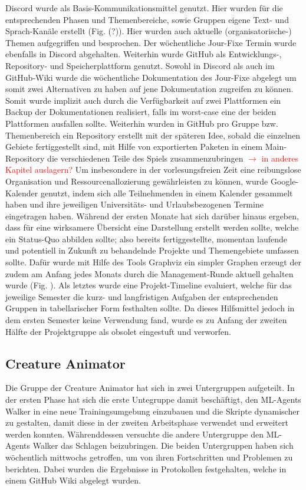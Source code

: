 Discord wurde als Basis-Kommunikationsmittel genutzt. Hier wurden für die entsprechenden Phasen und Themenbereiche, sowie Gruppen eigene Text- und Sprach-Kanäle erstellt (Fig. (?)). Hier wurden auch aktuelle (organisatorische-) Themen aufgegriffen und besprochen. Der wöchentliche Jour-Fixe Termin wurde ebenfalls in Discord abgehalten. Weiterhin wurde GitHub als Entwicklungs-, Repository- und Speicherplattform genutzt. Sowohl in Discord als auch im GitHub-Wiki wurde die wöchentliche Dokumentation des Jour-Fixe abgelegt um somit zwei Alternativen zu haben auf jene Dokumentation zugreifen zu können. Somit wurde implizit auch durch die Verfügbarkeit auf zwei Plattformen ein Backup der Dokumentationen realisiert, falls im worst-case eine der beiden Plattformen ausfallen sollte. Weiterhin wurden in GitHub pro Gruppe bzw. Themenbereich ein Repository erstellt mit der späteren Idee, sobald die einzelnen Gebiete fertiggestellt sind, mit Hilfe von exportierten Paketen in einem Main-Repository die verschiedenen Teile des Spiels zusammenzubringen  \textcolor{red}{$\rightarrow$ in anderes Kapitel auslagern?} Um insbesondere in der vorlesungsfreien Zeit eine reibungslose Organisation und Ressourcenallozierung gewährleisten zu können, wurde Google-Kalender genutzt, indem sich alle Teilnehmenden in einem Kalender gesammelt haben und ihre jeweiligen Universitäts- und Urlaubsbezogenen Termine eingetragen haben. Während der ersten Monate hat sich darüber hinaus ergeben, dass für eine wirksamere Übersicht eine Darstellung erstellt werden sollte, welche ein Status-Quo abbilden sollte; also bereits fertiggestellte, momentan laufende und potentiell in Zukunft zu behandelnde Projekte und Themengebiete umfassen sollte. Dafür wurde mit Hilfe des Tools Graphviz ein simpler Graphen erzeugt der zudem am Anfang jedes Monats durch die Management-Runde aktuell gehalten wurde (Fig. ). Als letztes wurde eine Projekt-Timeline evaluiert, welche für das jeweilige Semester die kurz- und langfristigen Aufgaben der entsprechenden Gruppen in tabellarischer Form festhalten sollte. Da dieses Hilfsmittel jedoch in dem ersten Semester keine Verwendung fand, wurde es zu Anfang der zweiten Hälfte der Projektgruppe als obsolet eingestuft und verworfen.


\subsection{Creature Animator}
Die Gruppe der Creature Animator hat sich in zwei Untergruppen aufgeteilt. In der ersten Phase hat sich die erste Untegruppe damit beschäftigt, den ML-Agents Walker in eine neue Trainingsumgebung einzubauen und die Skripte dynamischer zu gestalten, damit diese in der zweiten Arbeitsphase verwendet und erweitert werden konnten. Währenddessen versuchte die andere Untergruppe den ML-Agents Walker das Schlagen beizubringen. Die beiden Untergruppen haben sich wöchentlich mittwochs getroffen, um von ihren Fortschritten und Problemen zu berichten. Dabei wurden die Ergebnisse in Protokollen festgehalten, welche in einem GitHub Wiki abgelegt wurden.

